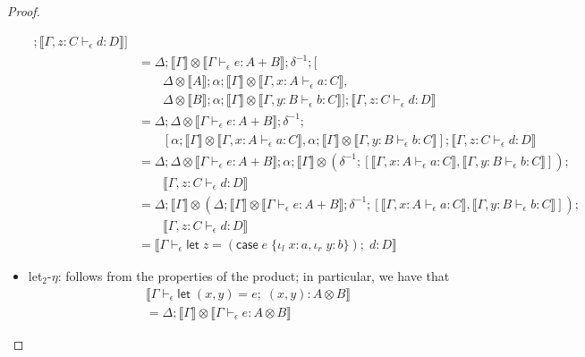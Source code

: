 \documentclass[acmsmall,screen,review]{acmart}
\newcommand{\ms}[1]{\ensuremath{\mathsf{#1}}}
\newcommand{\lto}{:}
\newcommand{\linl}[1]{\iota_l\;{#1}}
\newcommand{\linr}[1]{\iota_r\;{#1}}
\newcommand{\letexpr}[3]{\ensuremath{\ms{let}\;#1 = #2;\;#3}}
\newcommand{\caseexpr}[5]{\ms{case}\;#1\;\{\linl{#2} \lto #3, \linr{#4} \lto #5\}}
\newcommand{\bhyp}[2]{#1 : #2}
\newcommand{\hasty}[4]{#1 \vdash_{#2} #3: {#4}}
\newcommand{\brle}[1]{{\textsf{#1}}}
\newcommand{\dnt}[1]{\llbracket{#1}\rrbracket}
\begin{document}
\begin{proof}
\begin{itemize}[leftmargin=*]
\begin{align*}
            ; \dnt{\hasty{\Gamma, \bhyp{z}{C}}{\epsilon}{d}{D}}
        ]
      \\ &= \Delta ; \dnt{\Gamma} \otimes \dnt{\hasty{\Gamma}{\epsilon}{e}{A + B}} ; \delta^{-1} ; [
      \\ & \qquad \Delta \otimes \dnt{A} ; \alpha
            ; \dnt{\Gamma} \otimes \dnt{\hasty{\Gamma, \bhyp{x}{A}}{\epsilon}{a}{C}}
            ,
      \\  & \qquad \Delta \otimes \dnt{B} ; \alpha
            ; \dnt{\Gamma} \otimes \dnt{\hasty{\Gamma, \bhyp{y}{B}}{\epsilon}{b}{C}}
        ] ; \dnt{\hasty{\Gamma, \bhyp{z}{C}}{\epsilon}{d}{D}}
      \\ &= \Delta ; \Delta \otimes \dnt{\hasty{\Gamma}{\epsilon}{e}{A + B}} ; \delta^{-1} ; 
      \\ & \qquad [
            \alpha ; \dnt{\Gamma} \otimes \dnt{\hasty{\Gamma, \bhyp{x}{A}}{\epsilon}{a}{C}},
            \alpha ; \dnt{\Gamma} \otimes \dnt{\hasty{\Gamma, \bhyp{y}{B}}{\epsilon}{b}{C}}
        ] ; \dnt{\hasty{\Gamma, \bhyp{z}{C}}{\epsilon}{d}{D}}
      \\ &= \Delta ; \Delta \otimes \dnt{\hasty{\Gamma}{\epsilon}{e}{A + B}}  
                   ; \alpha ; \dnt{\Gamma} \otimes (\delta^{-1} ; [
                        \dnt{\hasty{\Gamma, \bhyp{x}{A}}{\epsilon}{a}{C}},
                        \dnt{\hasty{\Gamma, \bhyp{y}{B}}{\epsilon}{b}{C}}
                    ]) ;
      \\ & \qquad \dnt{\hasty{\Gamma, \bhyp{z}{C}}{\epsilon}{d}{D}}
      \\ &= \Delta ; \dnt{\Gamma} \otimes (
                  \Delta ; \dnt{\Gamma} \otimes \dnt{\hasty{\Gamma}{\epsilon}{e}{A + B}} ;
                  \delta^{-1} ; [
                        \dnt{\hasty{\Gamma, \bhyp{x}{A}}{\epsilon}{a}{C}},
                        \dnt{\hasty{\Gamma, \bhyp{y}{B}}{\epsilon}{b}{C}}
                    ]) ;
      \\ & \qquad \dnt{\hasty{\Gamma, \bhyp{z}{C}}{\epsilon}{d}{D}}
      \\ &= \dnt{\hasty{\Gamma}{\epsilon}{\letexpr{z}{(\caseexpr{e}{x}{a}{y}{b})}{d}}{D}}
    \end{align*}
    \item \brle{let$_2$-$\eta$}: follows from the properties of the product; in particular,
    we have that
    \begin{align*}
      &\dnt{\hasty{\Gamma}{\epsilon}{\letexpr{(x, y)}{e}{(x, y)}}{A \otimes B}} \\
      &= \Delta ; \dnt{\Gamma} \otimes \dnt{\hasty{\Gamma}{\epsilon}{e}{A \otimes B}}

\end{align*}
\end{itemize}
\end{proof}
\end{document}
